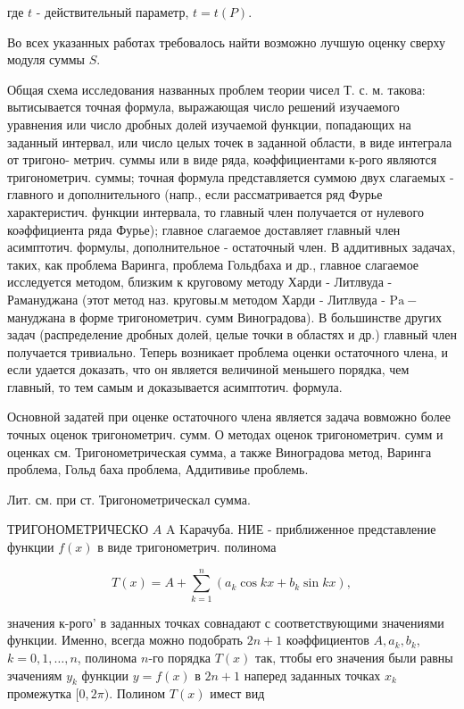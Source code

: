 \documentclass[10pt]{article}
\begin{document}
где $t$ - действительный параметр, $t=t(P)$.



Во всех указанных работах требовалось найти возможно лучшую оценку сверху модуля суммы $S$.



Общая схема исследования названных проблем теории чисел Т. с. м. такова: вытисывается точная формула, выражающая число решений изучаемого уравнения или число дробных долей изучаемой функции, попадающих на заданный интервал, или число целых точек в заданной области, в виде интеграла от тригоно- метрич. суммы или в виде ряда, коәффициентами к-рого являются тригонометрич. суммы; точная формула представляется суммою двух слагаемых - главного и дополнительного (напр., если рассматривается ряд Фурье характеристич. функции интервала, то главный член получается от нулевого коәффициента ряда Фурье); главное слагаемое доставляет главный член асимптотич. формулы, дополнительное - остаточный член. В аддитивных задачах, таких, как проблема Варинга, проблема Гольдбаха и др., главное слагаемое исследуется методом, близким к круговому методу Харди - Литлвуда - Рамануджана (этот метод наз. круговы.м методом Харди - Литлвуда - $\mathrm{Pa}-$ мануджана в форме тригонометрич. сумм Виноградова). В большинстве других задач (распределение дробных долей, целые точки в областях и др.) главный член получается тривиально. Теперь возникает проблема оценки остаточного члена, и если удается доказать, что он является величиной меньшего порядка, чем главный, то тем самым и доказывается асимптотич. формула.



Основной задатей при оценке остаточного члена является задача вовможно более точных оценок тригонометрич. сумм. О методах оценок тригонометрич. сумм и оценках см. Тригонометрическая сумма, а также Виноградова метод, Варинга проблема, Гольд баха проблема, Аддитивиье проблемь.



Лит. см. при ст. Тригонометрическал сумма.



ТРИГОНОМЕТРИЧЕСКО $A$ A Kарачуба. НИЕ - приближенное представление функции $f(x)$ в виде тригонометрич. полинома



\[

T(x)=A+\sum_{k=1}^{n}\left(a_{k} \cos k x+b_{k} \sin k x\right),

\]



значения к-рого' в заданных точках совнадают с соответствующими значениями функции. Именно, всегда можно подобрать $2 n+1$ коәффициентов $A, a_{k}, b_{k}$, $k=0,1, \ldots, n$, полинома $n$-го порядка $T(x)$ так, ттобы его значения были равны зчачениям $y_{k}$ функции $y=f(x)$ в $2 n+1$ наперед заданных точках $x_{k}$ промежутка $[0,2 \pi)$. Полином $T(x)$ имест вид
\end{document}
